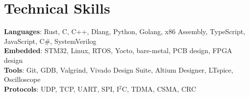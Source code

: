 \documentclass[letterpaper,11pt]{article}
\begin{document}
\section{Technical Skills}
 \begin{itemize}[leftmargin=0.15in, label={}]
    \small{\item{
     \textbf{Languages}{: Rust, C, C++, Dlang, Python, Golang, x86 Assembly, TypeScript, JavaScript, C\#, SystemVerilog} \\
     \textbf{Embedded}{: STM32, Linux, RTOS, Yocto, bare-metal, PCB design, FPGA design} \\
     \textbf{Tools}{: Git, GDB, Valgrind, Vivado Design Suite, Altium Designer, LTspice, Oscilloscope} \\
     \textbf{Protocols}{: UDP, TCP, UART, SPI, I$^2$C, TDMA, CSMA, CRC} \\
    }}
 \end{itemize}
\end{document}
